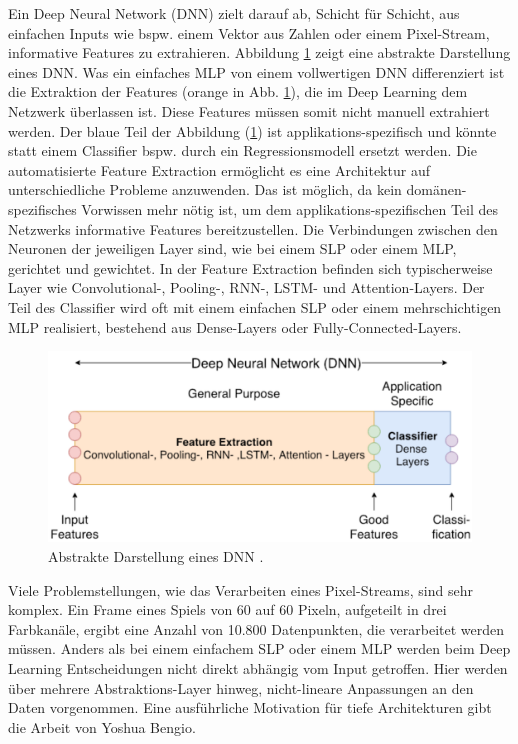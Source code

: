 Ein Deep Neural Network (DNN) zielt darauf ab, Schicht für Schicht, aus einfachen Inputs wie bspw. einem Vektor aus Zahlen oder einem Pixel-Stream, informative Features zu extrahieren. Abbildung \ref{fig:maucher_dnn} zeigt eine abstrakte Darstellung eines DNN. Was ein einfaches MLP von einem vollwertigen DNN differenziert ist die Extraktion der Features (orange in Abb. \ref{fig:maucher_dnn}), die im Deep Learning dem Netzwerk überlassen ist. Diese Features müssen somit nicht manuell extrahiert werden. Der blaue Teil der Abbildung (\ref{fig:maucher_dnn}) ist applikations-spezifisch und könnte statt einem Classifier bspw. durch ein Regressionsmodell ersetzt werden. Die automatisierte Feature Extraction ermöglicht es eine Architektur auf unterschiedliche Probleme anzuwenden. Das ist möglich, da kein domänen-spezifisches Vorwissen mehr nötig ist, um dem applikations-spezifischen Teil des Netzwerks informative Features bereitzustellen. Die Verbindungen zwischen den Neuronen der jeweiligen Layer sind, wie bei einem SLP oder einem MLP, gerichtet und gewichtet. In der Feature Extraction befinden sich typischerweise Layer wie Convolutional-, Pooling-, RNN-, LSTM- und Attention-Layers. Der Teil des Classifier wird oft mit einem einfachen SLP oder einem mehrschichtigen MLP realisiert, bestehend aus Dense-Layers oder Fully-Connected-Layers.
\begin{figure}[htb!]
 \centering
 \includegraphics[scale=0.34]{abb/maucher_dnn}
 \caption[Beschreibung]{Abstrakte Darstellung eines DNN \cite{maucher_nb_cnn}. }
\label{fig:maucher_dnn}
\end{figure}
\newline

Viele Problemstellungen, wie das Verarbeiten eines Pixel-Streams, sind sehr komplex. Ein Frame eines Spiels von 60 auf 60 Pixeln, aufgeteilt in drei Farbkanäle, ergibt eine Anzahl von 10.800 Datenpunkten, die verarbeitet werden müssen. Anders als bei einem einfachem SLP oder einem MLP werden beim Deep Learning Entscheidungen nicht direkt abhängig vom Input getroffen. Hier werden über mehrere Abstraktions-Layer hinweg, nicht-lineare Anpassungen an den Daten vorgenommen. Eine ausführliche Motivation für tiefe Architekturen gibt die Arbeit \cite{bengio2009learning} von Yoshua Bengio.

